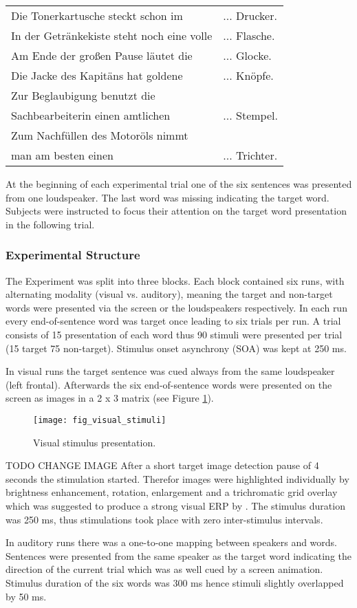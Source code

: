\documentclass[10pt,letterpaper]{article}
\begin{document}
\begin{tabular}[t]{ll}
Die Tonerkartusche steckt schon im 	& ... Drucker.\\
In der Getr\"ankekiste steht noch eine volle & ... Flasche.\\
Am Ende der großen Pause l\"autet die & ... Glocke.\\
Die Jacke des Kapit\"ans hat goldene & ... Kn\"opfe.\\
Zur Beglaubigung benutzt die \\
Sachbearbeiterin einen amtlichen	& ... Stempel.\\
Zum Nachf\"ullen des Motor\"ols nimmt\\
man am besten einen & ... Trichter.\\
\end{tabular}

At the beginning of each experimental trial one of the six sentences was presented from one loudspeaker.
The last word was missing indicating the target word.
Subjects were instructed to focus their attention on the target word presentation in the following trial.

\subsubsection{Experimental Structure}
The Experiment was split into three blocks.
Each block contained six runs, with alternating modality (visual vs. auditory), meaning the target and non-target words were presented via the screen or the loudspeakers respectively.
In each run every end-of-sentence word was target once leading to six trials per run.
A trial consists of 15 presentation of each word thus 90 stimuli were presented per trial (15 target 75 non-target).
Stimulus onset asynchrony (SOA) was kept at 250 ms.

In visual runs the target sentence was cued always from the same loudspeaker (left frontal).
Afterwards the six end-of-sentence words were presented on the screen as images in a 2 x 3 matrix (see Figure \ref{fig:visual_stimuli}).
\begin{figure}[ht]
	\texttt{[image: fig\_visual\_stimuli]}
	\caption{Visual stimulus presentation.} 
	\label{fig:visual_stimuli}
\end{figure} TODO CHANGE IMAGE
After a short target image detection pause of 4 seconds the stimulation started.
Therefor images were highlighted individually by brightness enhancement, rotation, enlargement and a trichromatic grid overlay which was suggested to produce a strong visual ERP by .
The stimulus duration was 250 ms, thus stimulations took place with zero inter-stimulus intervals.

In auditory runs there was a one-to-one mapping between speakers and words.
Sentences were presented from the same speaker as the target word indicating the direction of the current trial which was as well cued by a screen animation.
Stimulus duration of the six words was 300 ms hence stimuli slightly overlapped by 50 ms.




\setlength{\bibleftmargin}{.125in}
\setlength{\bibindent}{-\bibleftmargin}


\end{document}
